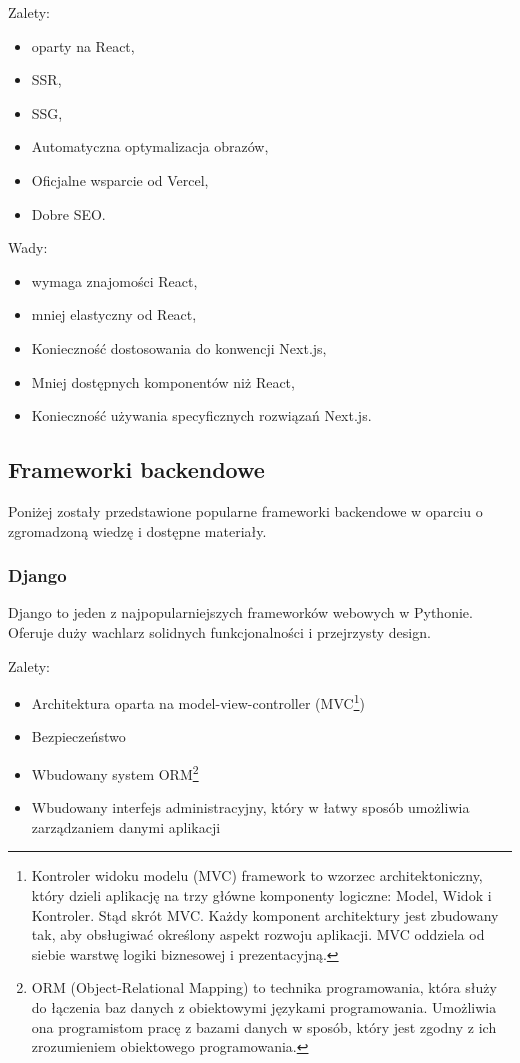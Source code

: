 Zalety:
\begin{itemize}
	\item oparty na React,
	\item SSR,
	\item SSG,
	\item Automatyczna optymalizacja obrazów,
	\item Oficjalne wsparcie od Vercel,
	\item Dobre SEO.
\end{itemize}

Wady:
\begin{itemize}
	\item wymaga znajomości React,
	\item mniej elastyczny od React,
	\item Konieczność dostosowania do konwencji Next.js,
	\item Mniej dostępnych komponentów niż React,
	\item Konieczność używania specyficznych rozwiązań Next.js.
\end{itemize}

\subsection{Frameworki backendowe}

Poniżej zostały przedstawione popularne frameworki backendowe w oparciu o zgromadzoną wiedzę i dostępne materiały\cite{medium_django_ruby_express_laravel}\cite{medium_spring_asp}.

\subsubsection{Django}

Django to jeden z najpopularniejszych frameworków webowych w Pythonie. Oferuje duży wachlarz solidnych funkcjonalności i przejrzysty design.


Zalety:
\begin{itemize}
	\item Architektura oparta na model-view-controller (MVC\footnote{Kontroler widoku modelu (MVC) framework to wzorzec architektoniczny, który dzieli aplikację na trzy główne komponenty logiczne: Model, Widok i Kontroler. Stąd skrót MVC. Każdy komponent architektury jest zbudowany tak, aby obsługiwać określony aspekt rozwoju aplikacji. MVC oddziela od siebie warstwę logiki biznesowej i prezentacyjną.\cite{guru99_mvc}})
	\item Bezpieczeństwo
	\item Wbudowany system ORM\footnote{ORM (Object-Relational Mapping) to technika programowania, która służy do łączenia baz danych z obiektowymi językami programowania. Umożliwia ona programistom pracę z bazami danych w sposób, który jest zgodny z ich zrozumieniem obiektowego programowania.\cite{nofluffjobs_orm}}
	\item Wbudowany interfejs administracyjny, który w łatwy sposób umożliwia zarządzaniem danymi aplikacji
\end{itemize} 


